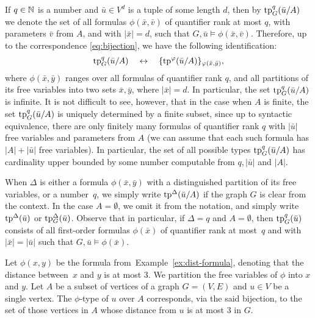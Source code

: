 If $q\in \mathbb{N}$ is a number and $\bar u\in  V^{d}$
is a tuple of some length $d$, then by $\mathrm{tp}^q_G(\bar u/A)$  we denote the set of all formulas $\phi(\bar x,\bar v)$
of quantifier rank at most $q$, with parameters $\bar v$ from $A$, and with $|\bar x|=d$,
such that $G,\bar u\models \phi(\bar x,\bar v)$.
Therefore, up to the correspondence \eqref{eq:bijection}, we have the following identification:
\begin{equation*}
\mathrm{tp}^q_G(\bar u/A)\quad\leftrightarrow\quad\{\mathrm{tp}^\varphi(\bar u/A)\}_{\varphi(\bar x,\bar y)},
\end{equation*}
where $\phi(\bar x,\bar y)$ ranges over all formulas of quantifier rank $q$, and all partitions of its free variables into two sets $\bar x,\bar y$,
where $|\bar x|=d$. 
In particular, the set $\mathrm{tp}^q_G(\bar u/A)$ is infinite.
It is not difficult to see, however, that in the case when $A$ is finite,
the set $\mathrm{tp}^q_G(\bar u/A)$ is uniquely determined by a finite subset, since up to syntactic equivalence, 
there are only finitely many formulas of quantifier rank $q$ with $|\bar u|$ free variables and parameters from $A$
(we can assume that each such formula has $|A|+|\bar u|$ free variables).
In particular, the set of all possible types 
$\mathrm{tp}^q_G(\bar u/A)$ has cardinality upper bounded by some number 
 computable from $q,|\bar u|$ and $|A|$.

When $\Delta$ is either a formula $\phi(\bar x,\bar y)$ with a distinguished partition of its free variables, or a number~$q$,
we simply write $\mathrm{tp}^\Delta(\bar u/A)$ if the graph $G$
is clear from the context.
In the case $A=\emptyset$, we omit it from the notation, 
and simply write $\mathrm{tp}^\Delta(\bar u)$ or $\mathrm{tp}^\Delta_G(\bar u)$.
Observe that in particular, if $\Delta=q$ and $A=\emptyset$, then $\mathrm{tp}^q_G(\bar u)$ consists of all first-order formulas $\phi(\bar x)$ of quantifier rank at most~$q$ and with $|\bar x|=|\bar u|$
such that $G,\bar u\models \phi(\bar x)$. 

\begin{example}
Let $\phi(x,y)$ be the formula from~Example~\ref{ex:dist-formula}, denoting that the distance between~$x$ and $y$ is at most $3$.
We  partition  the free variables of $\phi$
into $x$ and $y$.
Let $A$ be a subset of vertices of a graph $G=(V,E)$
and $u\in V$ be a single vertex.
The $\phi$-type of $u$ over $A$
corresponds, via the said bijection, to the set of those vertices in $A$
whose distance from $u$ is at most $3$ in $G$.
\end{example}


